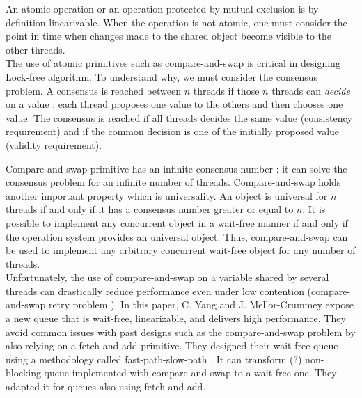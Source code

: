 An atomic operation or an operation protected by mutual exclusion is by
definition linearizable. When the operation is not atomic, one must consider the
point in time when changes made to the shared object become visible to the other
threads. \\

 The use of atomic primitives such as compare-and-swap is critical in designing
Lock-free algorithm. To understand why, we must consider the consensus problem.
A consensus is reached between $n$ threads if those $n$ threads can
\textit{decide} on a value : each thread proposes one value to the others and
then chooses one value. The consensus is reached if all threads decides the same
value (consistency requirement) and if the common decision is one of the
initially proposed value (validity requirement).

Compare-and-swap primitive has an infinite consensus number
\cite{Herlihy:1991:WS:114005.102808} : it can solve the consensus problem for an
infinite number of threads. Compare-and-swap holds another important property
which is universality. An object is universal for $n$ threads if and only if it
has a consensus number greater or equal to $n$. It is possible to implement any
concurrent object in a wait-free manner if and only if the operation system
provides an universal object. Thus, compare-and-swap can be used to implement
any arbitrary concurrent wait-free object for any number of threads. \\

 Unfortunately, the use of compare-and-swap on a variable shared by several
threads can drastically reduce performance even under low contention
(compare-and-swap retry problem \cite{Morrison:2013:FCQ:2517327.2442527}). In
this paper, C. Yang and J. Mellor-Crummey expose a new queue that is wait-free,
linearizable, and delivers high performance. They avoid common issues with past
designs such as the compare-and-swap problem by also relying on a fetch-and-add
primitive. They designed their wait-free queue using a methodology called
fast-path-slow-path \cite{Kogan:2012:MCF:2370036.2145835}. It can transform (?)
non-blocking queue implemented with compare-and-swap to a wait-free one. They
adapted it for queues also using fetch-and-add.
